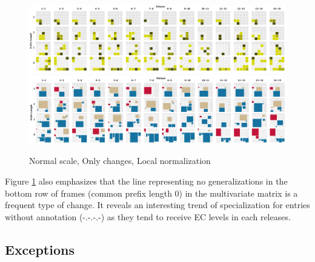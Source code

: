 \begin{figure}[htb]
  \centering
  \includegraphics[width=17cm]{images/heatmap000.png}     
  \includegraphics[width=17cm]{images/squaremap000.png}
  \caption{Normal scale, Only changes, Local normalization}
  \label{fig:heatmap000}
\end{figure}


Figure \ref{fig:heatmap000} also emphasizes that the line representing no generalizations in the bottom row of frames (common prefix length 0) in the multivariate matrix is a frequent type of change. It reveals an interesting trend of specialization for entries without annotation (-.-.-.-) as they tend to receive EC levels in each releases.


\subsection{Exceptions} 
\label{sec:exceptions}


